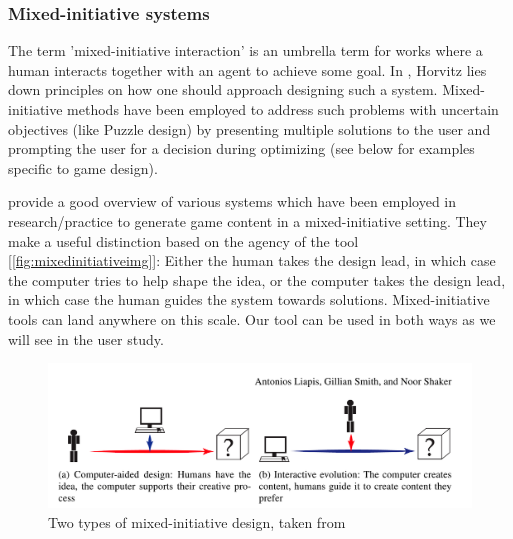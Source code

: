 
\subsubsection{Mixed-initiative systems}
The term 'mixed-initiative interaction' is an umbrella term for works where a human interacts together with an agent to achieve some goal. In \cite{Horvitz1999}, Horvitz lies down principles on how one should approach designing such a system. Mixed-initiative methods have been employed to address such problems with uncertain objectives (like Puzzle design) by presenting multiple solutions to the user and prompting the user for a decision during optimizing (see below for examples specific to game design). %

\cite{Liapis2016} provide a good overview of various systems which have been employed in research/practice to generate game content in a mixed-initiative setting. They make a useful distinction based on the agency of the tool [\autoref{fig:mixedinitiativeimg}]: Either the human takes the design lead, in which case the computer tries to help shape the idea, or the computer takes the design lead, in which case the human guides the system towards solutions. Mixed-initiative tools can land anywhere on this scale. Our tool can be used in both ways as we will see in the user study.

\begin{figure}
    \centering
    \includegraphics[width=1.0\linewidth]{figures/cadvsinteractiveevol.png}
    
    \caption[Two types of mixed-initiative design]{ Two types of mixed-initiative design, taken from \cite{Liapis2016} %
      \label{fig:mixedinitiativeimg}}
\end{figure}

